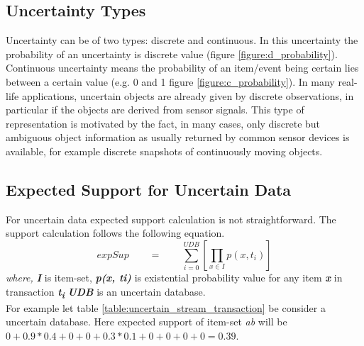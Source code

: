 \subsection{Uncertainty Types}
Uncertainty can be of two types: discrete and continuous. In this uncertainty the probability of an uncertainty is discrete value (figure \ref{figure:d_probability}). Continuous uncertainty means the probability of an item/event being certain lies between a certain value (e.g. 0 and 1 figure \ref{figure:c_probability}). In many real-life applications, uncertain objects are already given by discrete observations, in particular if the objects are derived from sensor signals. This type of representation is motivated by the fact, in many cases, only discrete but ambiguous object information as usually returned by common sensor devices is available, for example discrete snapshots of continuously moving objects.

\subsection{Expected Support for Uncertain Data}
For uncertain data expected support calculation is not straightforward. The support calculation follows the following equation.
    \begin{equation}
expSup \qquad = \qquad \sum_{i = 0}^{UDB} [\prod_{x \in I } p(x , t_i)]
    \end{equation}
\emph {where,}    \textbf{\emph {I}} is item-set,    \textbf{\emph { p(x, ti)}} is existential probability value for any item \textbf{\emph {x}} in transaction \textbf{\emph {t\textsubscript{i}}} \textbf{\emph {UDB}} is an uncertain database.\\
For example let table \ref{table:uncertain_stream_transaction} be consider a uncertain database. Here expected support of item-set \emph{ab} will be $0+0.9*0.4+0+0+0.3*0.1+0+0+0+0=0.39$.

